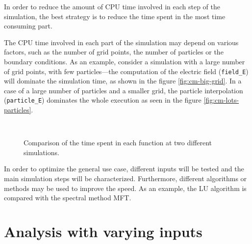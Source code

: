 \documentclass[a4paper]{report}
\begin{document}

In order to reduce the amount of CPU time involved in each step of the 
simulation, the best strategy is to reduce the time spent in the most time 
consuming part.

The CPU time involved in each part of the simulation may depend on various 
factors, such as the number of grid points, the number of particles or the 
boundary conditions. As an example, consider a simulation with a large number of 
grid points, with few particles---the computation of the electric field 
(\texttt{field\_E}) will dominate the simulation time, as shown in the figure 
\ref{fig:cm-big-grid}. In a case of a large number of particles and a smaller 
grid, the particle interpolation (\texttt{particle\_E}) dominates the whole 
execution as seen in the figure \ref{fig:cm-lots-particles}.

\begin{figure}[h]
	\centering
	\\
	\caption{Comparison of the time spent in each function at two different 
	simulations.}
\end{figure}

In order to optimize the general use case, different inputs will be tested and 
the main simulation steps will be characterized. Furthermore, different 
algorithms or methods may be used to improve the speed. As an example, the LU 
algorithm is compared with the spectral method MFT.

\section{Analysis with varying inputs}



%
%

%
%
\end{document}
